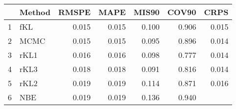 \documentclass[12pt]{article}
\begin{document}
\thispagestyle{empty}
\begin{table}[ht]
\centering
\begin{tabular}{rlrrrrr}
  \hline
 & Method & RMSPE & MAPE & MIS90 & COV90 & CRPS \\ 
  \hline
1 & fKL & 0.015 & 0.015 & 0.100 & 0.906 & 0.015 \\ 
  2 & MCMC & 0.015 & 0.015 & 0.095 & 0.896 & 0.014 \\ 
  3 & rKL1 & 0.016 & 0.016 & 0.098 & 0.777 & 0.014 \\ 
  4 & rKL3 & 0.018 & 0.018 & 0.091 & 0.816 & 0.014 \\ 
  5 & rKL2 & 0.019 & 0.019 & 0.114 & 0.871 & 0.016 \\ 
  6 & NBE & 0.019 & 0.019 & 0.136 & 0.940 &  \\ 
   \hline
\end{tabular}
\end{table}
\end{document}
